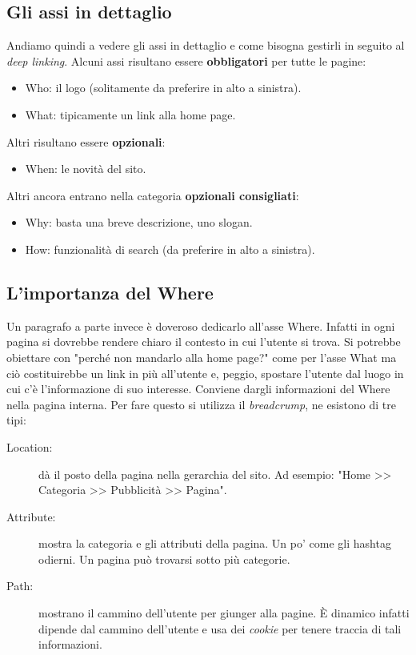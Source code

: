 		\subsection{Gli assi in dettaglio}
			Andiamo quindi a vedere gli assi in dettaglio e come bisogna gestirli in seguito al \emph{deep linking}.
			Alcuni assi risultano essere \textbf{obbligatori} per tutte le pagine:
			\begin{itemize}
				\item Who: il logo (solitamente da preferire in alto a sinistra).
				\item What: tipicamente un link alla home page.
			\end{itemize}
			Altri risultano essere \textbf{opzionali}:
			\begin{itemize}
				\item When: le novità del sito.
			\end{itemize}
			Altri ancora entrano nella categoria \textbf{opzionali consigliati}:
			\begin{itemize}
				\item Why: basta una breve descrizione, uno slogan.
				\item How: funzionalità di search (da preferire in alto a sinistra).
			\end{itemize}
		
		\subsection{L'importanza del Where}
			Un paragrafo a parte invece è doveroso dedicarlo all'asse Where. Infatti in ogni pagina si dovrebbe rendere chiaro il contesto in cui l'utente si trova. Si potrebbe obiettare con "perché non mandarlo alla home page?" come per l'asse What ma ciò costituirebbe un link in più all'utente e, peggio, spostare l'utente dal luogo in cui c'è l'informazione di suo interesse. Conviene dargli informazioni del Where nella pagina interna.
				Per fare questo si utilizza il \emph{breadcrump}, ne esistono di tre tipi:
				\begin{description}
					\item[Location:] dà il posto della pagina nella gerarchia del sito. Ad esempio: "Home >> Categoria >> Pubblicità >> Pagina".
					\item[Attribute:] mostra la categoria e gli attributi della pagina. Un po' come gli hashtag odierni. Un pagina può trovarsi sotto più categorie.
					\item[Path:] mostrano il cammino dell'utente per giunger alla pagine. È dinamico infatti dipende dal cammino dell'utente e usa dei \emph{cookie} per tenere traccia di tali informazioni.
				\end{description}
				
